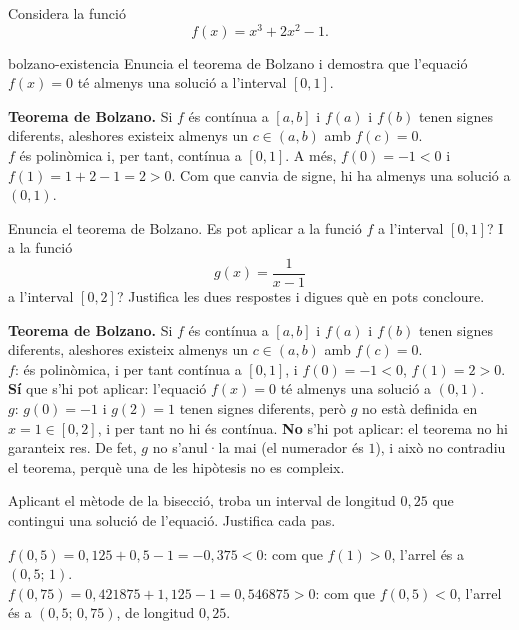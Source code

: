 Considera la funció
\[
f(x)=x^3+2x^2-1 .
\]

\begin{apartats}

\begin{tria}{bolzano-existencia}
Enuncia el teorema de Bolzano i demostra que l'equació $f(x)=0$ té almenys una solució a
l'interval $[0,1]$.

\begin{solucio}
\textbf{Teorema de Bolzano.} Si $f$ és contínua a $[a,b]$ i $f(a)$ i $f(b)$ tenen signes
diferents, aleshores existeix almenys un $c\in(a,b)$ amb $f(c)=0$.\\
$f$ és polinòmica i, per tant, contínua a $[0,1]$. A més, $f(0)=-1<0$ i $f(1)=1+2-1=2>0$.
Com que canvia de signe, hi ha almenys una solució a $(0,1)$.
\end{solucio}

Enuncia el teorema de Bolzano. Es pot aplicar a la funció $f$ a l'interval $[0,1]$? I a la
funció
\[
g(x)=\frac{1}{x-1}
\]
a l'interval $[0,2]$? Justifica les dues respostes i digues què en pots concloure.

\begin{solucio}
\textbf{Teorema de Bolzano.} Si $f$ és contínua a $[a,b]$ i $f(a)$ i $f(b)$ tenen signes
diferents, aleshores existeix almenys un $c\in(a,b)$ amb $f(c)=0$.\\
$f$: és polinòmica, i per tant contínua a $[0,1]$, i $f(0)=-1<0$, $f(1)=2>0$. \textbf{Sí}
que s'hi pot aplicar: l'equació $f(x)=0$ té almenys una solució a $(0,1)$.\\
$g$: $g(0)=-1$ i $g(2)=1$ tenen signes diferents, però $g$ no està definida en $x=1\in[0,2]$,
i per tant no hi és contínua. \textbf{No} s'hi pot aplicar: el teorema no hi garanteix res.
De fet, $g$ no s'anul·la mai (el numerador és $1$), i això no contradiu el teorema, perquè
una de les hipòtesis no es compleix.
\end{solucio}
\end{tria}

Aplicant el mètode de la bisecció, troba un interval de longitud $0{,}25$ que contingui una
solució de l'equació. Justifica cada pas.

\begin{solucio}
$f(0{,}5)=0{,}125+0{,}5-1=-0{,}375<0$: com que $f(1)>0$, l'arrel és a
$\left(0{,}5;\,1\right)$.\\
$f(0{,}75)=0{,}421875+1{,}125-1=0{,}546875>0$: com que $f(0{,}5)<0$, l'arrel és a
$\left(0{,}5;\,0{,}75\right)$, de longitud $0{,}25$.
\end{solucio}


\end{apartats}
